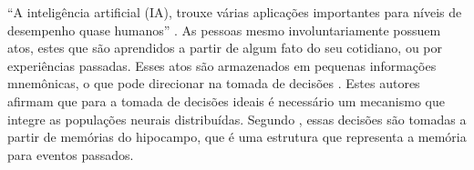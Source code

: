 “A inteligência artificial (IA), trouxe várias aplicações importantes para níveis de desempenho quase humanos” \cite{anthes}.
As pessoas mesmo involuntariamente possuem atos, estes que são aprendidos a partir de algum fato do seu cotidiano, ou por experiências passadas. Esses atos são armazenados em pequenas informações mnemônicas, o que pode direcionar na tomada de decisões \cite{buzsaki}. Estes autores afirmam que para a tomada de decisões ideais é necessário um mecanismo que integre as populações neurais distribuídas. Segundo \cite{eichenbaum}, essas decisões são tomadas a partir de memórias do hipocampo, que é uma estrutura que representa a memória para eventos passados.

